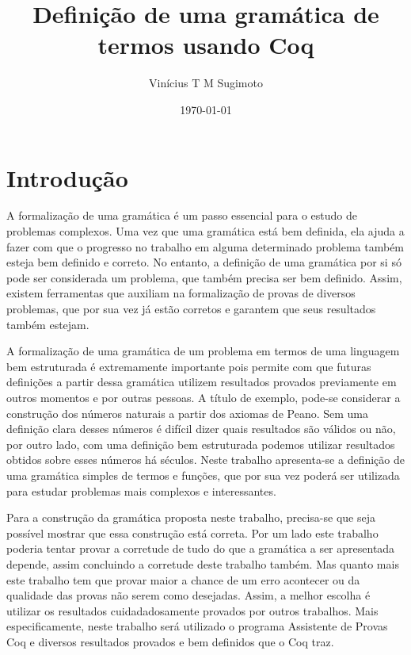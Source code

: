 \documentclass{article}
\title{Definição de uma gramática de termos usando Coq}
\author{Vinícius T M Sugimoto}
\date{\today}
\begin{document}
\maketitle

\section{Introdução} %
\label{section:introducao}

A formalização de uma gramática é um passo essencial para o estudo de problemas complexos.
Uma vez que uma gramática está bem definida, ela ajuda a fazer com que o progresso no trabalho
em alguma determinado problema também esteja bem definido e correto. No entanto, a definição
de uma gramática por si só pode ser considerada um problema, que também precisa ser bem definido.
Assim, existem ferramentas que auxiliam na formalização de provas de diversos problemas, que por
sua vez já estão corretos e garantem que seus resultados também estejam.

A formalização de uma gramática de um problema em termos de uma linguagem bem estruturada é
extremamente importante pois permite com que futuras definições a partir dessa gramática utilizem
resultados provados previamente em outros momentos e por outras pessoas. A título de exemplo, pode-se
considerar a construção dos números naturais a partir dos axiomas de Peano. Sem uma definição clara
desses números é difícil dizer quais resultados são válidos ou não, por outro lado, com uma definição
bem estruturada podemos utilizar resultados obtidos sobre esses números há séculos. Neste trabalho
apresenta-se a definição de uma gramática simples de termos e funções, que por sua vez poderá ser
utilizada para estudar problemas mais complexos e interessantes.



Para a construção da gramática proposta neste trabalho, precisa-se que seja possível mostrar que essa
construção está correta. Por um lado este trabalho poderia tentar provar a corretude de tudo do que a
gramática a ser apresentada depende, assim concluindo a corretude deste trabalho também. Mas quanto
mais este trabalho tem que provar maior a chance de um erro acontecer ou da qualidade das provas não
serem como desejadas. Assim, a melhor escolha é utilizar os resultados cuidadadosamente provados por
outros trabalhos. Mais especificamente, neste trabalho será utilizado o programa Assistente de Provas
Coq e diversos resultados provados e bem definidos que o Coq traz.
\end{document}

